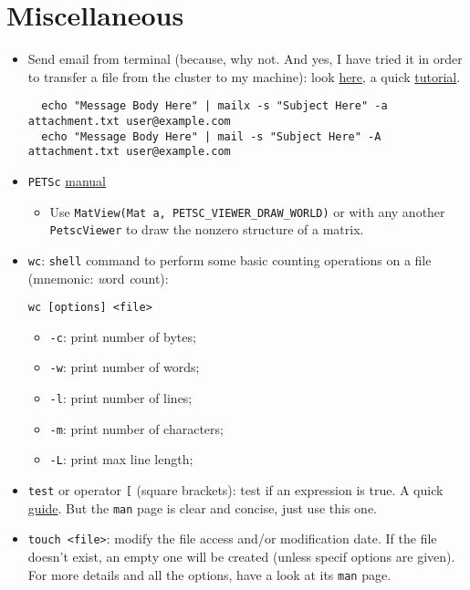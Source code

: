 \documentclass[a4paper,12pt,%
              final%
              ]{article}
\begin{document}
\section{Miscellaneous}
\begin{itemize}
  \item Send email from terminal (because, why not. And yes, I have tried it in order to transfer a file from the cluster to my machine): look \href{https://www.tecmint.com/send-email-attachment-from-linux-commandline/}{here}, a quick \href{https://www.interserver.net/tips/kb/linux-mail-command-usage-examples/}{tutorial}.
\begin{verbatim}
  echo "Message Body Here" | mailx -s "Subject Here" -a attachment.txt user@example.com
  echo "Message Body Here" | mail -s "Subject Here" -A attachment.txt user@example.com
\end{verbatim}
  \item \texttt{PETSc} \href{https://www.mcs.anl.gov/petsc/petsc-current/docs/manual.pdf}{manual}
    \begin{itemize}
      \item Use \verb|MatView(Mat a, PETSC_VIEWER_DRAW_WORLD)| or with any another \texttt{PetscViewer} to draw the nonzero structure of a matrix.
    \end{itemize}
  \item \texttt{wc}: \texttt{shell} command to perform some basic counting operations on a file (mnemonic: \emph{w}ord \emph{c}ount):
\begin{verbatim}
wc [options] <file>
\end{verbatim}
    \begin{itemize}
      \item \verb|-c|: print number of bytes;
      \item \verb|-w|: print number of words;
      \item \verb|-l|: print number of lines;
      \item \verb|-m|: print number of characters;
      \item \verb|-L|: print max line length;
    \end{itemize}
  \item \texttt{test} or operator \verb|[| (square brackets): test if an expression is true. A quick \href{https://www.computerhope.com/unix/test.htm}{guide}. But the \texttt{man} page is clear and concise, just use this one.
  \item \verb|touch <file>|: modify the file access and/or modification date. If the file doesn't exist, an empty one will be created (unless specif options are given). For more details and all the options, have a look at its \texttt{man} page.

\end{itemize}
\end{document}
